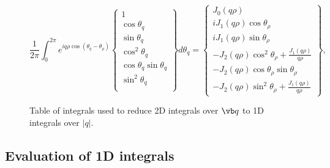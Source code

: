 \documentclass[letterpaper]{article}
\begin{document}
\begin{figure}
$$
 \frac{1}{2\pi} 
 \int_0^{2\pi} e^{i q \rho \cos(\theta_q -\theta_\rho)}
 \left\{\begin{array}{c}
 1 \\[5pt]
 \cos\theta_q \\[5pt]
 \sin\theta_q \\[5pt]
 \cos^2\theta_q \\[5pt]
 \cos\theta_q \sin\theta_q \\[5pt]
 \sin^2\theta_q \\
 \end{array}\right\}
 d\theta_q 
= \left\{ \begin{array}{l}
    J_0 (q\rho)                           \\[5pt]
    i J_1(q\rho) \cos \theta_\rho          \\[5pt]
    i J_1(q\rho) \sin \theta_\rho          \\[5pt]
    - J_2(q\rho) \cos^2\theta_\rho + \frac{J_1(q\rho)}{q\rho} \\[5pt]
    -J_2(q\rho) \cos\theta_\rho \sin \theta_\rho              \\[5pt]
    - J_2(q\rho) \sin^2 \theta_\rho + \frac{J_1(q\rho)}{q\rho} 
  \end{array}\right\},
$$
\caption{Table of integrals used to reduce 2D integrals over $\vb q$ to
         1D integrals over $|q|$.}
\label{BesselIntegralTable}
\end{figure}

\subsection*{Evaluation of 1D integrals}
\end{document}
